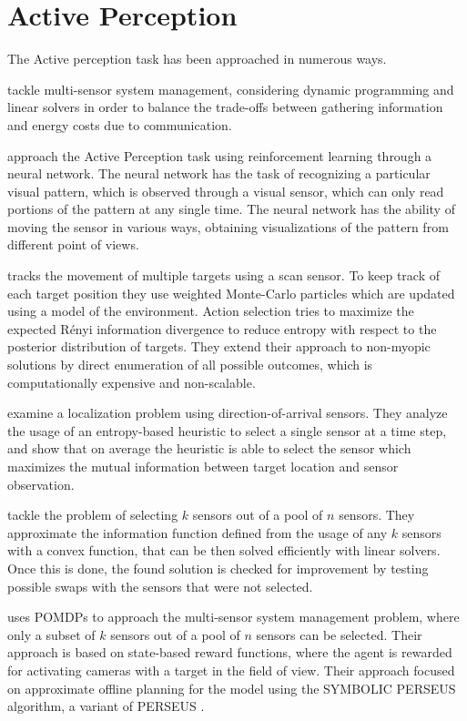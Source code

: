 \section{Active Perception}
The Active perception task has been approached in numerous ways.

\cite{cit:relworklagrange} tackle multi-sensor system management, considering dynamic programming
and linear solvers in order to balance the trade-offs between gathering information and energy costs
due to communication.

\cite{cit:relworkneuralnet} approach the Active Perception task using reinforcement learning through
a neural network. The neural network has the task of recognizing a particular visual pattern, which
is observed through a visual sensor, which can only read portions of the pattern at any single time.
The neural network has the ability of moving the sensor in various ways, obtaining visualizations of
the pattern from different point of views.

\cite{cit:relworktanks} tracks the movement of multiple targets using a scan sensor. To keep track
of each target position they use weighted Monte-Carlo particles which are updated using a model of
the environment. Action selection tries to maximize the expected Rényi information divergence to
reduce entropy with respect to the posterior distribution of targets. They extend their approach to
non-myopic solutions by direct enumeration of all possible outcomes, which is computationally
expensive and non-scalable.

\cite{cit:relworkentropy} examine a localization problem using direction-of-arrival sensors. They
analyze the usage of an entropy-based heuristic to select a single sensor at a time step, and show
that on average the heuristic is able to select the sensor which maximizes the mutual information
between target location and sensor observation.

\cite{cit:relworkconvex} tackle the problem of selecting $k$ sensors out of a pool of $n$ sensors.
They approximate the information function defined from the usage of any $k$ sensors with a convex
function, that can be then solved efficiently with linear solvers. Once this is done, the found
solution is checked for improvement by testing possible swaps with the sensors that were not selected.

\cite{cit:relworkspaan} uses POMDPs to approach the multi-sensor system management problem, where
only a subset of $k$ sensors out of a pool of $n$ sensors can be selected. Their approach is based
on state-based reward functions, where the agent is rewarded for activating cameras with a target in
the field of view. Their approach focused on approximate offline planning for the model using
the SYMBOLIC PERSEUS algorithm, a variant of PERSEUS \cite{cit:perseus}.

